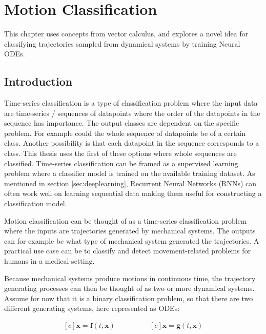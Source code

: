 \documentclass[12pt,a4paper]{book}
\begin{document}
\chapter{Motion Classification}
\label{cha:motionclassification}

This chapter uses concepts from vector calculus, and explores a novel idea for classifying trajectories sampled from dynamical systems by training Neural ODEs.

\section{Introduction}
\label{sec:motionclassificationintroduction}

Time-series classification is a type of classification problem where the input data are time-series / sequences of datapoints where the order of the datapoints in the sequence has importance. The output classes are dependent on the specific problem. For example could the whole sequence of datapoints be of a certain class. Another possibility is that each datapoint in the sequence corresponds to a class. This thesis uses the first of these options where whole sequences are classified. Time-series classification can be framed as a supervised learning problem where a classifier model is trained on the available training dataset. As mentioned in section \ref{sec:deeplearning}, Recurrent Neural Networks (RNNs) can often work well on learning sequential data making them useful for constructing a classification model.

Motion classification can be thought of as a time-series classification problem where the inputs are trajectories generated by mechanical systems. The outputs can for example be what type of mechanical system generated the trajectories. A practical use case can be to classify and detect movement-related problems for humans in a medical setting.

Because mechanical systems produce motions in continuous time, the trajectory generating processes can then be thought of as two or more dynamical systems. Assume for now that it is a binary classification problem, so that there are two different generating systems, here represented as ODEs:

\begin{equation*}
    \begin{aligned}[c]
        \dot{\bm{x}} = \bm{f}(t, \bm{x})
    \end{aligned}
    \qquad \qquad
    \begin{aligned}[c]
        \dot{\bm{x}} = \bm{g}(t, \bm{x})
    \end{aligned}
\end{equation*}
\end{document}
